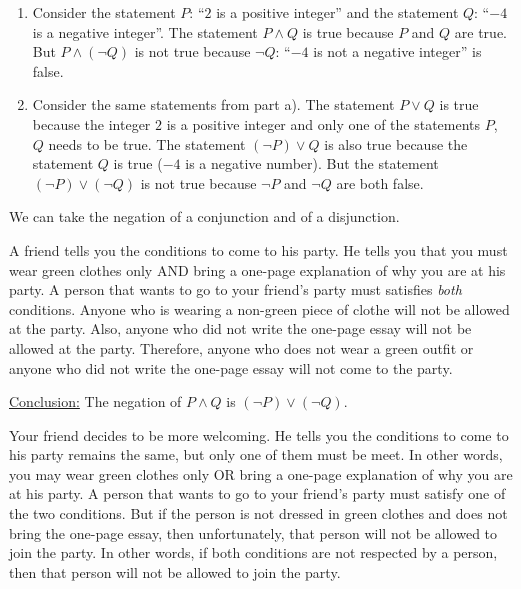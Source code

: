 \vspace*{12pt}

\begin{example}
\begin{enumerate}[label=\alph*)]
\item Consider the statement $P$: ``$2$ is a positive integer'' and the statement $Q$: ``$-4$ is a negative integer''. The statement $P \wedge Q$ is true because $P$ and $Q$ are true. But $P \wedge (\neg Q)$ is not true because $\neg Q$: ``$-4$ is not a negative integer'' is false.
\item Consider the same statements from part a). The statement $P \vee Q$ is true because the integer $2$ is a positive integer and only one of the statements $P$, $Q$ needs to be true. The statement $(\neg P) \vee Q$ is also true because the statement $Q$ is true ($-4$ is a negative number). But the statement $(\neg P) \vee (\neg Q)$ is not true because $\neg P$ and $\neg Q$ are both false.
\end{enumerate}
\end{example}

We can take the negation of a conjunction and of a disjunction.

\begin{example}
A friend tells you the conditions to come to his party. He tells you that you must wear green clothes only AND bring a one-page explanation of why you are at his party. A person that wants to go to your friend's party must satisfies \textit{both} conditions. Anyone who is wearing a non-green piece of clothe will not be allowed at the party. Also, anyone who did not write the one-page essay will not be allowed at the party. Therefore, anyone who does not wear a green outfit or anyone who did not write the one-page essay will not come to the party. 
\end{example}

\underline{Conclusion:} The negation of $P \wedge Q$ is $(\neg P) \vee (\neg Q)$.

\begin{example}
Your friend decides to be more welcoming. He tells you the conditions to come to his party remains the same, but only one of them must be meet. In other words, you may wear green clothes only OR bring a one-page explanation of why you are at his party. A person that wants to go to your friend's party must satisfy one of the two conditions. But if the person is not dressed in green clothes and does not bring the one-page essay, then unfortunately, that person will not be allowed to join the party. In other words, if both conditions are not respected by a person, then that person will not be allowed to join the party.
\end{example}

